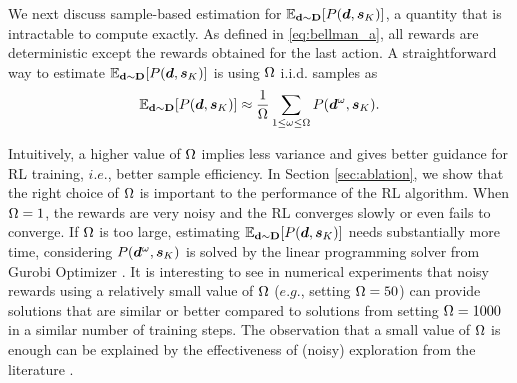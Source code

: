 \documentclass{article} %
\begin{document}
We next discuss sample-based estimation for $\mathbb{E}_{\mathbf{d}\sim \mathbf{D}}[P(\boldsymbol{d}, {\boldsymbol s}_K)]$, a quantity that is intractable to compute exactly.
As defined in \eqref{eq:bellman_a}, 
all rewards are deterministic except the rewards obtained for the last action. A straightforward way to estimate $\mathbb{E}_{\mathbf{d}\sim \mathbf{D}}[P(\boldsymbol{d}, {\boldsymbol s}_K)]$ is using $\Omega$ i.i.d. samples as 
\begin{equation}\label{eq:rewardwithsamples}
\mathbb{E}_{\mathbf{d}\sim \mathbf{D}}[P(\boldsymbol{d}, {\boldsymbol s}_K)] \approx \frac{1}{\Omega}\sum_{1 \leq \omega \leq \Omega} P(\boldsymbol{d}^{\omega}, {\boldsymbol s}_K).   \end{equation}
\vspace{-3mm}

Intuitively, a higher value of $\Omega$ implies less variance and gives better guidance for RL training, $i.e.$, better sample efficiency. In Section \ref{sec:ablation}, we show that the right choice of $\Omega$ is important to the performance of the RL algorithm. 
When $\Omega=1$, the rewards are very noisy and the RL converges slowly or even fails to converge.
If $\Omega$ is too large, estimating $\mathbb{E}_{\mathbf{d}\sim \mathbf{D}}[P(\boldsymbol{d}, {\boldsymbol s}_K)]$ needs substantially more time, considering $P(\boldsymbol{d}^\omega, {\boldsymbol s}_K)$ is solved by 
the linear programming solver from Gurobi Optimizer \citep{gurobi}. It is interesting to see in numerical experiments that noisy rewards using a relatively small value of $\Omega$  ($e.g.$, setting $\Omega = 50$) can provide solutions that are similar or better compared to solutions from setting $\Omega = 1000$ in a similar number of training steps. The observation that a small value of $\Omega$ is enough can be explained by the effectiveness of (noisy) exploration from the literature \citep{fortunato2017noisy,plappert2017parameter}. 

\end{document}
